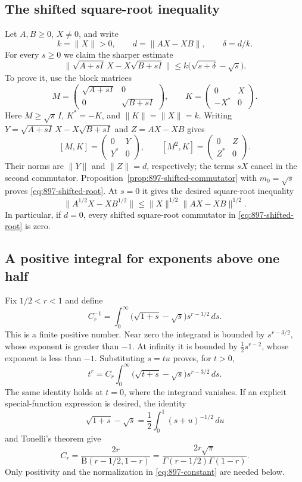\documentclass[11pt,a4paper]{article}
\theoremstyle{remark}
\begin{document}
\subsection{The shifted square-root inequality}

Let $A,B\ge0$, $X\ne0$, and write
\[
 k=\|X\|>0,\qquad d=\|AX-XB\|,\qquad\delta=d/k.
\]
For every $s\ge0$ we claim the sharper estimate
\[
 \|\sqrt{A+sI}\,X-X\sqrt{B+sI}\|
 \le k\bigl(\sqrt{s+\delta}-\sqrt s\bigr).
 \tag{897.5}\label{eq:897-shifted-root}
\]
To prove it, use the block matrices
\[
 M=\begin{pmatrix}\sqrt{A+sI}&0\\0&\sqrt{B+sI}\end{pmatrix},
 \qquad
 K=\begin{pmatrix}0&X\\-X^*&0\end{pmatrix}.
\]
Here $M\ge\sqrt s\,I$, $K^*=-K$, and $\|K\|=\|X\|=k$.
Writing $Y=\sqrt{A+sI}\,X-X\sqrt{B+sI}$ and $Z=AX-XB$ gives
\[
 [M,K]=\begin{pmatrix}0&Y\\Y^*&0\end{pmatrix},
 \qquad
 [M^2,K]=\begin{pmatrix}0&Z\\Z^*&0\end{pmatrix}.
\]
Their norms are $\|Y\|$ and $\|Z\|=d$, respectively; the terms $sX$
cancel in the second commutator. Proposition~\ref{prop:897-shifted-commutator}
with $m_0=\sqrt s$ proves \eqref{eq:897-shifted-root}.
At $s=0$ it gives the desired square-root inequality
\[
 \|A^{1/2}X-XB^{1/2}\|\le\|X\|^{1/2}\|AX-XB\|^{1/2}.
 \tag{897.6}\label{eq:897-root}
\]
In particular, if $d=0$, every shifted square-root commutator in
\eqref{eq:897-shifted-root} is zero.

\subsection{A positive integral for exponents above one half}

Fix $1/2<r<1$ and define
\[
 C_r^{-1}
 =\int_0^\infty\bigl(\sqrt{1+s}-\sqrt s\bigr)s^{r-3/2}\,ds.
 \tag{897.7}\label{eq:897-constant}
\]
This is a finite positive number. Near zero the integrand is bounded by
$s^{r-3/2}$, whose exponent is greater than $-1$. At infinity it is
bounded by $\tfrac12s^{r-2}$, whose exponent is less than $-1$.
Substituting $s=tu$ proves, for $t>0$,
\[
 t^r=C_r\int_0^\infty
       \bigl(\sqrt{t+s}-\sqrt s\bigr)s^{r-3/2}\,ds.
 \tag{897.8}\label{eq:897-integral}
\]
The same identity holds at $t=0$, where the integrand vanishes.
If an explicit special-function expression is desired, the identity
\[
 \sqrt{1+s}-\sqrt s=\frac12\int_0^1(s+u)^{-1/2}\,du
\]
and Tonelli's theorem give
\[
 C_r=\frac{2r}{\mathrm B(r-1/2,1-r)}
     =\frac{2r\sqrt\pi}{\Gamma(r-1/2)\Gamma(1-r)}.
\]
Only positivity and the normalization in \eqref{eq:897-constant} are
needed below.
\end{document}
